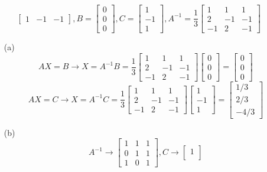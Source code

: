 \begin{itemize}
$$\begin{bmatrix}
1 & -1 & -1
\end{bmatrix}, B = \begin{bmatrix}
0 \\
0 \\
0
\end{bmatrix}, C = \begin{bmatrix}
1 \\
-1 \\
1
\end{bmatrix}, A^{-1} = \frac{1}{3}\begin{bmatrix}
1 & 1 & 1 \\
2 & -1 & -1 \\
-1 & 2 & -1
\end{bmatrix} $$
\begin{itemize}
\item[(a)]
$$AX = B \rightarrow X = A^{-1}B = \frac{1}{3}\begin{bmatrix}
1 & 1 & 1 \\
2 & -1 & -1 \\
-1 & 2 & -1
\end{bmatrix}\begin{bmatrix}
0 \\
0 \\
0
\end{bmatrix} = \begin{bmatrix}
0 \\
0 \\
0
\end{bmatrix}$$
$$AX = C \rightarrow X = A^{-1}C = \frac{1}{3}\begin{bmatrix}
1 & 1 & 1 \\
2 & -1 & -1 \\
-1 & 2 & -1
\end{bmatrix}\begin{bmatrix}
1 \\
-1 \\
1
\end{bmatrix} = \begin{bmatrix}
1/3 \\
2/3 \\
-4/3
\end{bmatrix}$$
\item[(b)]
$$A^{-1} \rightarrow \begin{bmatrix}
1 & 1 & 1 \\
0 & 1 & 1 \\
1 & 0 & 1
\end{bmatrix}, C \rightarrow \begin{bmatrix}
1 \\

\end{bmatrix}$$
\end{itemize}
\end{itemize}
